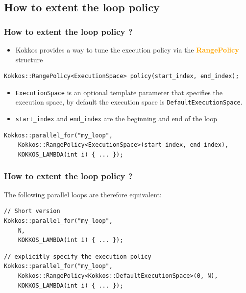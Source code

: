\documentclass[aspectratio=169]{beamer}
\newcommand{\highlight}[1]{\textcolor{orange}{\textbf{#1}}}
\begin{document}

\subsection[Extended loop policy]{How to extent the loop policy}


\begin{frame}[fragile]
    \frametitle{How to extent the loop policy ?}

\begin{itemize}
    \item Kokkos provides a way to tune the execution policy via the \highlight{RangePolicy} structure
\end{itemize}

\small
\begin{verbatim}
Kokkos::RangePolicy<ExecutionSpace> policy(start_index, end_index);
\end{verbatim}

\begin{itemize}
    \item \texttt{ExecutionSpace} is an optional template parameter that specifies the execution space, by default the execution space is \texttt{DefaultExecutionSpace}.
    \item \texttt{start\_index} and \texttt{end\_index} are the beginning and end of the loop
\end{itemize}

\small
\begin{verbatim}
Kokkos::parallel_for("my_loop", 
    Kokkos::RangePolicy<ExecutionSpace>(start_index, end_index),
    KOKKOS_LAMBDA(int i) { ... });
\end{verbatim}

\end{frame}


\begin{frame}[fragile]
    \frametitle{How to extent the loop policy ?}

The following parallel loops are therefore equivalent:

\small
\begin{verbatim}
// Short version
Kokkos::parallel_for("my_loop", 
    N,
    KOKKOS_LAMBDA(int i) { ... });
\end{verbatim}

\begin{verbatim}
// explicitly specify the execution policy
Kokkos::parallel_for("my_loop", 
    Kokkos::RangePolicy<Kokkos::DefaultExecutionSpace>(0, N),
    KOKKOS_LAMBDA(int i) { ... });
\end{verbatim}

\end{frame}
\end{document}
